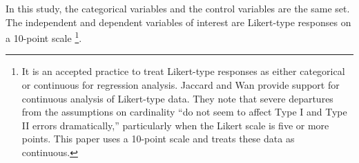 In this study, the categorical variables and the control variables are the same set.
The independent and dependent variables of interest are Likert-type responses on a 10-point scale
\footnote{
    It is an accepted practice to treat Likert-type responses as either categorical or continuous for regression analysis.
    Jaccard and Wan provide support for continuous analysis of Likert-type data.
    They note that severe departures from the assumptions on cardinality ``do not seem to affect Type I and Type II errors dramatically,''
    particularly when the Likert scale is five or more points\cite{jaccard1996lisrel}.
    This paper uses a 10-point scale and treats these data as continuous.
}.
